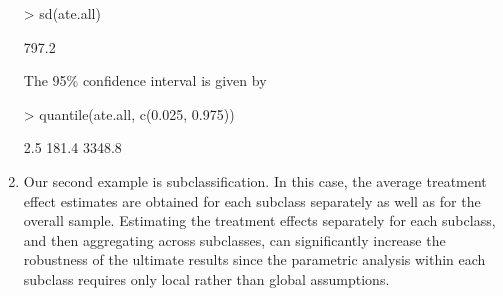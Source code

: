 \begin{enumerate}
\begin{Schunk}
\begin{Soutput}
\end{Soutput}
\begin{Sinput}
> sd(ate.all)
\end{Sinput}
\begin{Soutput}
[1] 797.2

\end{Soutput}
\end{Schunk}
The 95\% confidence interval is given by
\begin{Schunk}
\begin{Sinput}
> quantile(ate.all, c(0.025, 0.975))
\end{Sinput}
\begin{Soutput}
  2.5%  97.5% 
 181.4 3348.8 

\end{Soutput}
\end{Schunk}
  
\item Our second example is subclassification. In this case, the
  average treatment effect estimates are obtained for each subclass
  separately as well as for the overall sample.  Estimating the
  treatment effects separately for each subclass, and then aggregating
  across subclasses, can significantly increase the robustness of the
  ultimate results since the parametric analysis within each subclass
  requires only local rather than global assumptions.


\end{enumerate}
